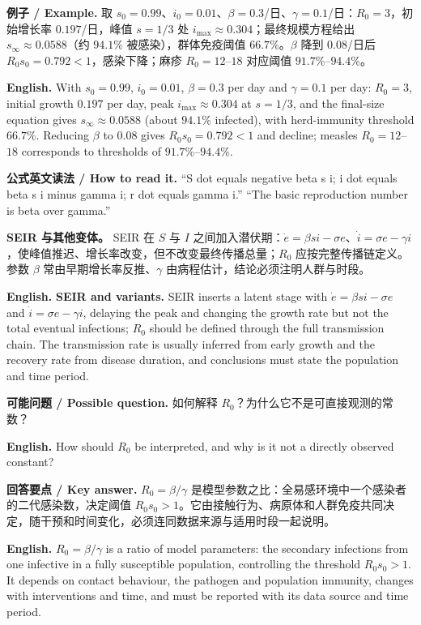 \documentclass[UTF8,11pt,a4paper]{ctexart}
\newcommand{\EN}[1]{\par\noindent\textbf{English.} #1\par}
\newcommand{\READ}[1]{\par\noindent\textbf{公式英文读法 / How to read it.} #1\par}
\newcommand{\EX}[2]{\par\noindent\textbf{例子 / Example.} #1\par\EN{#2}}
\newcommand{\ASK}[4]{\par\noindent\textbf{可能问题 / Possible question.} #1\par\EN{#2}\noindent\textbf{回答要点 / Key answer.} #3\par\EN{#4}\smallskip}
\begin{document}
\EX{取 $s_0=0.99$、$i_0=0.01$、$\beta=0.3$/日、$\gamma=0.1$/日：$R_0=3$，初始增长率 $0.197$/日，峰值 $s=1/3$ 处 $i_{\max}\approx0.304$；最终规模方程给出 $s_\infty\approx0.0588$（约 $94.1\%$ 被感染），群体免疫阈值 $66.7\%$。$\beta$ 降到 $0.08$/日后 $R_0s_0=0.792<1$，感染下降；麻疹 $R_0=12$--$18$ 对应阈值 $91.7\%$--$94.4\%$。}{With $s_0=0.99$, $i_0=0.01$, $\beta=0.3$ per day and $\gamma=0.1$ per day: $R_0=3$, initial growth $0.197$ per day, peak $i_{\max}\approx0.304$ at $s=1/3$, and the final-size equation gives $s_\infty\approx0.0588$ (about $94.1\%$ infected), with herd-immunity threshold $66.7\%$. Reducing $\beta$ to $0.08$ gives $R_0s_0=0.792<1$ and decline; measles $R_0=12$--$18$ corresponds to thresholds of $91.7\%$--$94.4\%$.}
\READ{“S dot equals negative beta s i; i dot equals beta s i minus gamma i; r dot equals gamma i.” “The basic reproduction number is beta over gamma.”}
\noindent\textbf{SEIR 与其他变体。} SEIR 在 $S$ 与 $I$ 之间加入潜伏期：$\dot e=\beta si-\sigma e$、$\dot i=\sigma e-\gamma i$，使峰值推迟、增长率改变，但不改变最终传播总量；$R_0$ 应按完整传播链定义。参数 $\beta$ 常由早期增长率反推、$\gamma$ 由病程估计，结论必须注明人群与时段。
\EN{\textbf{SEIR and variants.} SEIR inserts a latent stage with $\dot e=\beta si-\sigma e$ and $\dot i=\sigma e-\gamma i$, delaying the peak and changing the growth rate but not the total eventual infections; $R_0$ should be defined through the full transmission chain. The transmission rate is usually inferred from early growth and the recovery rate from disease duration, and conclusions must state the population and time period.}
\ASK{如何解释 $R_0$？为什么它不是可直接观测的常数？}{How should $R_0$ be interpreted, and why is it not a directly observed constant?}{$R_0=\beta/\gamma$ 是模型参数之比：全易感环境中一个感染者的二代感染数，决定阈值 $R_0s_0>1$。它由接触行为、病原体和人群免疫共同决定，随干预和时间变化，必须连同数据来源与适用时段一起说明。}{$R_0=\beta/\gamma$ is a ratio of model parameters: the secondary infections from one infective in a fully susceptible population, controlling the threshold $R_0s_0>1$. It depends on contact behaviour, the pathogen and population immunity, changes with interventions and time, and must be reported with its data source and time period.}
\end{document}
